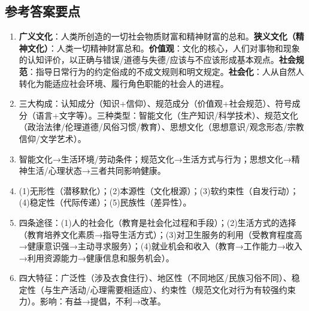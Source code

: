 \subsection*{参考答案要点}

\begin{enumerate}[leftmargin=*, itemsep=5pt]
    \item \textbf{广义文化}：人类所创造的一切社会物质财富和精神财富的总和。\textbf{狭义文化（精神文化）}：人类一切精神财富总和。\textbf{价值观}：文化的核心，人们对事物和现象的认知评价，以正确与错误/道德与失德/应该与不应该形成基本观点。\textbf{社会规范}：指导日常行为的约定俗成的不成文规则和明文规定。\textbf{社会化}：人从自然人转化为能适应社会环境、履行角色职能的社会人的进程。
    \item 三大构成：认知成分（知识+信仰）、规范成分（价值观+社会规范）、符号成分（语言+文字等）。三种类型：智能文化（生产知识/科学技术）、规范文化（政治法律/伦理道德/风俗习惯/教育）、思想文化（思想意识/观念形态/宗教信仰/文学艺术）。
    \item 智能文化→生活环境/劳动条件；规范文化→生活方式与行为；思想文化→精神生活/心理状态→三者共同影响健康。
    \item (1)无形性（潜移默化）；(2)本源性（文化根源）；(3)软约束性（自发行动）；(4)稳定性（代际传递）；(5)民族性（差异性）。
    \item 四条途径：(1)人的社会化（教育是社会化过程和手段）；(2)生活方式的选择（教育培养文化素质→指导生活方式）；(3)对卫生服务的利用（受教育程度高→健康意识强→主动寻求服务）；(4)就业机会和收入（教育→工作能力→收入→利用资源能力→健康信息和服务机会）。
    \item 四大特征：广泛性（涉及衣食住行）、地区性（不同地区/民族习俗不同）、稳定性（与生产活动/心理需要相适应）、约束性（规范文化对行为有较强约束力）。影响：有益→提倡，不利→改革。
\end{enumerate}

\newpage
